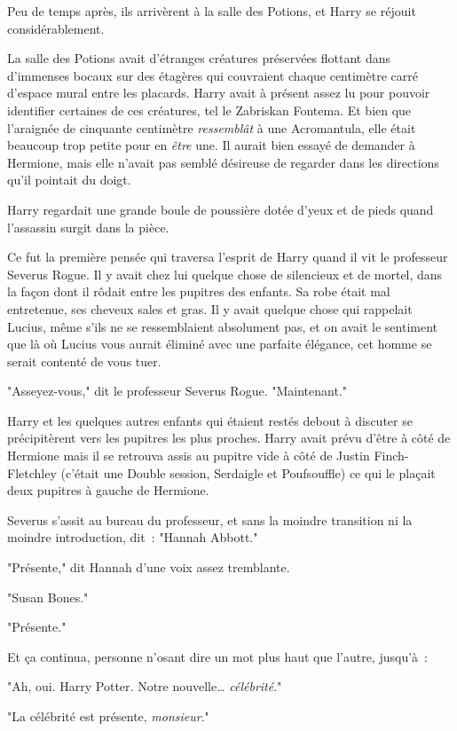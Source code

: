 Peu de temps après, ils arrivèrent à la salle des Potions, et Harry se réjouit considérablement.

La salle des Potions avait d'étranges créatures préservées flottant dans d'immenses bocaux sur des étagères qui couvraient chaque centimètre carré d'espace mural entre les placards. Harry avait à présent assez lu pour pouvoir identifier certaines de ces créatures, tel le Zabriskan Fontema. Et bien que l'araignée de cinquante centimètre \emph{ressemblât} à une Acromantula, elle était beaucoup trop petite pour en \emph{être} une. Il aurait bien essayé de demander à Hermione, mais elle n'avait pas semblé désireuse de regarder dans les directions qu'il pointait du doigt.

Harry regardait une grande boule de poussière dotée d'yeux et de pieds quand l'assassin surgit dans la pièce.

Ce fut la première pensée qui traversa l'esprit de Harry quand il vit le professeur Severus Rogue. Il y avait chez lui quelque chose de silencieux et de mortel, dans la façon dont il rôdait entre les pupitres des enfants. Sa robe était mal entretenue, ses cheveux sales et gras. Il y avait quelque chose qui rappelait Lucius, même s'ils ne se ressemblaient absolument pas, et on avait le sentiment que là où Lucius vous aurait éliminé avec une parfaite élégance, cet homme se serait contenté de vous tuer.

"Asseyez-vous," dit le professeur Severus Rogue. "Maintenant."

Harry et les quelques autres enfants qui étaient restés debout à discuter se précipitèrent vers les pupitres les plus proches. Harry avait prévu d'être à côté de Hermione mais il se retrouva assis au pupitre vide à côté de Justin Finch-Fletchley (c'était une Double session, Serdaigle et Poufsouffle) ce qui le plaçait deux pupitres à gauche de Hermione.

Severus s'assit au bureau du professeur, et sans la moindre transition ni la moindre introduction, dit~: "Hannah Abbott."

"Présente," dit Hannah d'une voix assez tremblante.

"Susan Bones."

"Présente."

Et ça continua, personne n'osant dire un mot plus haut que l'autre, jusqu'à~:

"Ah, oui. Harry Potter. Notre nouvelle… \emph{célébrité}."

"La célébrité est présente, \emph{monsieur}."

